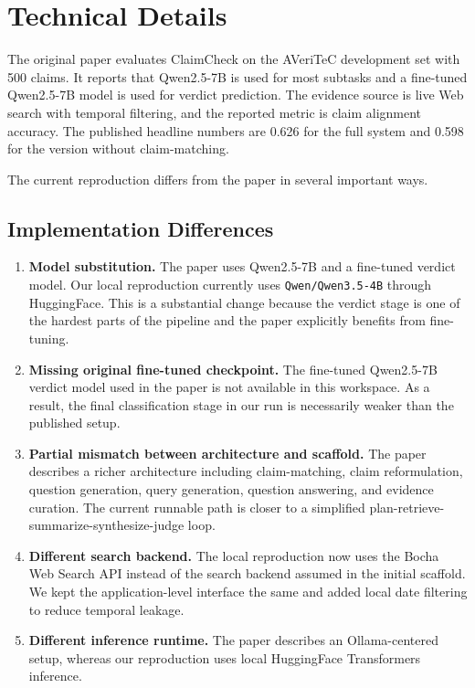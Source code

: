 \documentclass[11pt]{article}
\begin{document}
\section*{Technical Details}
The original paper evaluates ClaimCheck on the AVeriTeC development set with 500 claims. It reports that Qwen2.5-7B is used for most subtasks and a fine-tuned Qwen2.5-7B model is used for verdict prediction. The evidence source is live Web search with temporal filtering, and the reported metric is claim alignment accuracy. The published headline numbers are 0.626 for the full system and 0.598 for the version without claim-matching.

The current reproduction differs from the paper in several important ways.

\subsection*{Implementation Differences}
\begin{enumerate}[leftmargin=*]
\item \textbf{Model substitution.} The paper uses Qwen2.5-7B and a fine-tuned verdict model. Our local reproduction currently uses \texttt{Qwen/Qwen3.5-4B} through HuggingFace. This is a substantial change because the verdict stage is one of the hardest parts of the pipeline and the paper explicitly benefits from fine-tuning.
\item \textbf{Missing original fine-tuned checkpoint.} The fine-tuned Qwen2.5-7B verdict model used in the paper is not available in this workspace. As a result, the final classification stage in our run is necessarily weaker than the published setup.
\item \textbf{Partial mismatch between architecture and scaffold.} The paper describes a richer architecture including claim-matching, claim reformulation, question generation, query generation, question answering, and evidence curation. The current runnable path is closer to a simplified plan-retrieve-summarize-synthesize-judge loop.
\item \textbf{Different search backend.} The local reproduction now uses the Bocha Web Search API instead of the search backend assumed in the initial scaffold. We kept the application-level interface the same and added local date filtering to reduce temporal leakage.
\item \textbf{Different inference runtime.} The paper describes an Ollama-centered setup, whereas our reproduction uses local HuggingFace Transformers inference.
\end{enumerate}
\end{document}
